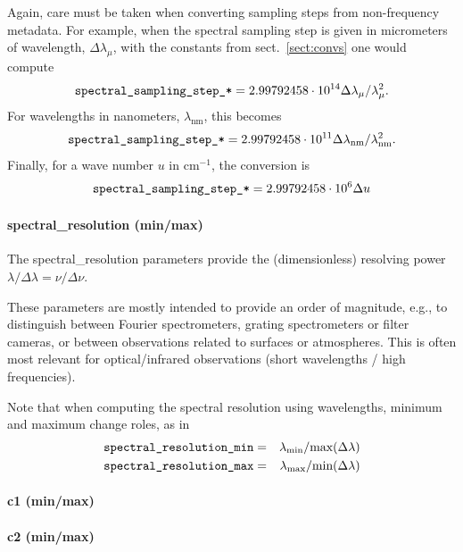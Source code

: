 \documentclass[11pt,a4paper]{ivoa}
\begin{document}
Again, care must be taken when converting sampling steps from
non-frequency metadata.  For example, when the spectral sampling step is
given in micrometers of wavelength,
$\Delta\lambda_\mu$, with the constants from
sect.~\ref{sect:convs} one would compute
$$\hbox{\texttt{spectral\_sampling\_step\_*}}
= 2.99792458\cdot10^{14}\Delta\lambda_\mu/\lambda_\mu^2.$$
For wavelengths in nanometers, $\lambda_{\textrm{nm}}$, this becomes
$$\hbox{\texttt{spectral\_sampling\_step\_*}}
= 2.99792458\cdot10^{11}\Delta\lambda_{\textrm{nm}}/
\lambda_{\textrm{nm}}^2.$$
Finally, for a wave number $u$ in $\textrm{cm}^{-1}$, the conversion is
$$\hbox{\texttt{spectral\_sampling\_step\_*}}  =
2.99792458\cdot10^{6}\Delta u$$

\paragraph{spectral\_resolution (min/max)}

The spectral\_resolution parameters provide the (dimensionless)
resolving power $\lambda/\Delta\lambda = \nu/\Delta\nu$.

These parameters are mostly intended to provide an order of magnitude,
e.g., to distinguish between Fourier spectrometers, grating spectrometers
or filter cameras, or between observations related to surfaces or
atmospheres. This is often most relevant for optical/infrared observations
(short wavelengths / high frequencies).

Note that when computing the spectral resolution using wavelengths,
minimum and maximum change roles, as in
\begin{eqnarray*}
\hbox{\texttt{spectral\_resolution\_min}}
&=& \lambda_\textrm{min} / \textrm{max}(\Delta\lambda)\\
\hbox{\texttt{spectral\_resolution\_max}}
&=& \lambda_\textrm{max} / \textrm{min}(\Delta\lambda)
\end{eqnarray*}

\paragraph{c1 (min/max)}

\paragraph{c2 (min/max)}
\vspace{-15pt}
\end{document}
